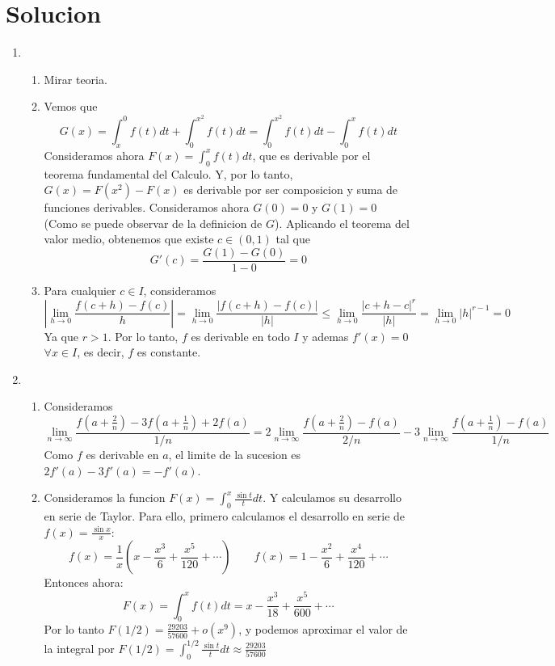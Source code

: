 \documentclass{article}
\newcommand{\abs}[1]{\left\lvert #1 \right\rvert}
\begin{document}
\section*{Solucion}
\begin{enumerate}
\item \begin{enumerate}
\item Mirar teoria.
\item Vemos que 
\[
G(x) = \int_x^{0}f(t)dt + \int_0^{x^2}f(t)dt = \int_0^{x^2}f(t)dt - \int_0^x f(t)dt
\]
Consideramos ahora $\displaystyle F(x) = \int_0^x f(t)dt$, que es derivable por el teorema
fundamental del Calculo. Y, por lo tanto, $G(x) = F(x^2) - F(x)$ es derivable por ser composicion
y suma de funciones derivables. Consideramos ahora $G(0) = 0$ y $G(1) = 0$ (Como se puede
observar de la definicion de $G$). Aplicando el teorema del valor medio, obtenemos
que existe $c \in (0,1)$ tal que
\[
G'(c) = \frac{G(1)-G(0)}{1-0}=0
\]
\item Para cualquier $c \in I$, consideramos
\[
\abs{\lim_{h \to 0} \frac{f(c+h) - f(c)}{h}} = \lim_{h \to 0} \frac{\abs{f(c+h) - f(c)}}{\abs{h}}
\leq \lim_{h \to 0} \frac{\abs{c+h-c}^r}{\abs{h}} = \lim_{h \to 0}\abs{h}^{r-1} = 0
\]
Ya que $r > 1$. Por lo tanto, $f$ es derivable en todo $I$ y ademas $f'(x)=0$ $\forall x \in I$, es
decir, $f$ es constante.
\end{enumerate}
\item \begin{enumerate}
\item Consideramos 
\[
\lim_{n \to \infty} \frac{f\left( a+\frac{2}{n} \right) - 3f \left( a + \frac{1}{n} \right) + 2f(a)}{1/n} =
2\lim_{n \to \infty} \frac{f \left( a+\frac{2}{n}\right) - f(a)}{2/n} -
3\lim_{n \to \infty} \frac{f\left(a+\frac{1}{n}\right) - f(a)}{1/n}
\]
Como $f$ es derivable en $a$, el limite de la sucesion es $2f'(a) - 3f'(a) = -f'(a)$.
\item Consideramos la funcion $\displaystyle F(x) = \int_0^{x} \frac{\sin t}{t}dt$. Y calculamos su
desarrollo en serie de Taylor. Para ello, primero calculamos el desarrollo en serie de
$f(x)=\frac{\sin x}{x}$:
\[
f(x) = \frac{1}{x} \left(  x - \frac{x^3}{6} + \frac{x^5}{120} + \cdots \right)
\quad \quad
f(x) = 1 - \frac{x^2}{6} + \frac{x^4}{120} + \cdots
\]
Entonces ahora:
\[
F(x) = \int_0^{x} f(t)dt = x - \frac{x^3}{18} + \frac{x^5}{600} + \cdots
\]
Por lo tanto $F(1/2) = \frac{29203}{57600} + o(x^9)$, y podemos aproximar el valor de la integral
por $\displaystyle F(1/2) = \int_0^{1/2}\frac{\sin t}{t}dt \approx \frac{29203}{57600}$

\end{enumerate}
\end{enumerate}
\end{document}
